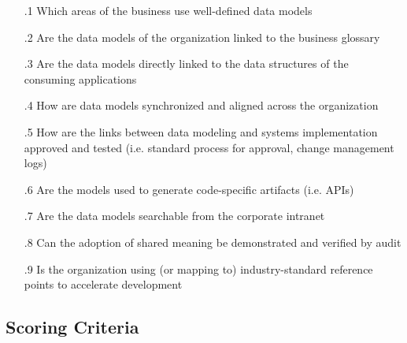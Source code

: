 \begin{itemize}[leftmargin=.5in]

  \item [\thesection.1] Which areas of the business use well-defined data models
  \item [\thesection.2] Are the data models of the organization linked to the business glossary
  \item [\thesection.3] Are the data models directly linked to the data structures of the consuming applications
  \item [\thesection.4] How are data models synchronized and aligned across the organization
  \item [\thesection.5] How are the links between data modeling and systems implementation approved and tested (i.e. standard process for approval, change management logs)
  \item [\thesection.6] Are the models used to generate code-specific artifacts (i.e. APIs)
  \item [\thesection.7] Are the data models searchable from the corporate intranet
  \item [\thesection.8] Can the adoption of shared meaning be demonstrated and verified by audit
  \item [\thesection.9] Is the organization using (or mapping to) industry-standard reference points to accelerate development

\end{itemize}

\subsection*{Scoring Criteria}

\kgmmscoringlevelOne

